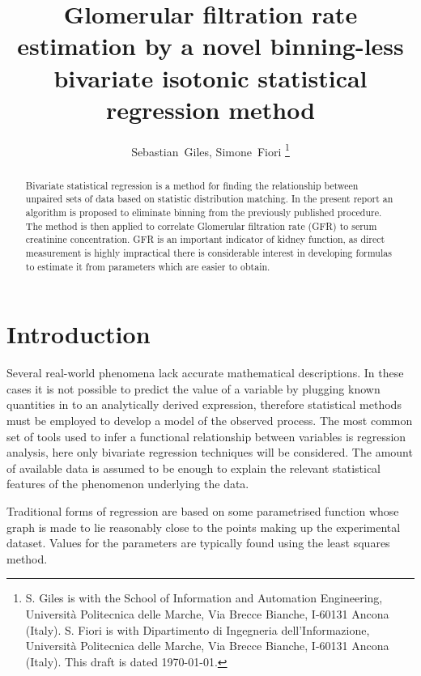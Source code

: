 \documentclass[10pt,final]{siamltex}
\begin{document}
\title{Glomerular filtration rate estimation by a novel binning-less bivariate isotonic statistical regression method}
\author{Sebastian~Giles, Simone~Fiori%
\thanks{S. Giles is with the School of Information and Automation Engineering,
Universit\`{a} Politecnica delle Marche,
Via Brecce Bianche, I-60131 Ancona (Italy).
\newline\indent
S. Fiori is with Dipartimento di Ingegneria dell'Informazione,
Universit\`{a} Politecnica delle Marche,
Via Brecce Bianche, I-60131 Ancona (Italy).
\newline\indent
This draft is dated \today.}}
\maketitle
\def\bbbr{\mathbb{R}}
\def\bbbx{\mathbb{X}}
\def\bbby{\mathbb{Y}}
\def\mdef{{\stackrel{{\mathrm{def}}}{=}}}
\renewcommand*{\thefootnote}{\fnsymbol{footnote}}
\def\to{\mathbf{\ to\ }}
\setcounter{footnote}{1}
%
%
\begin{abstract}
  Bivariate statistical regression is a method for finding the relationship between unpaired sets of data based on statistic distribution matching. In the present report an  algorithm is proposed to eliminate binning from the previously published procedure. The method is then applied to correlate Glomerular filtration rate (GFR) to serum creatinine concentration. GFR is an important indicator of kidney function, as direct measurement is highly impractical there is considerable interest in developing formulas to estimate it from parameters which are easier to obtain.
\end{abstract}
%
\section{Introduction}
Several real-world phenomena lack accurate mathematical descriptions. In these cases it is not possible to predict the value of a variable by plugging known quantities in to an analytically derived expression, therefore statistical methods must be employed to develop a model of the observed process. The most common set of tools used to infer a functional relationship between variables is regression analysis, here only bivariate regression techniques will be considered. The amount of available data is assumed to be enough to explain the relevant statistical features of the phenomenon underlying the data.

Traditional forms of regression are based on some parametrised function whose graph is made to lie reasonably close to the points making up the experimental dataset. Values for the parameters are typically found using the least squares method.
\end{document}
